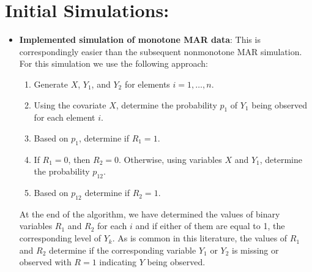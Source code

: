 
\section*{Initial Simulations:}

\begin{itemize}
  \item \textbf{Implemented simulation of monotone MAR data}: 
    This is correspondingly easier than the subsequent nonmonotone MAR
    simulation. For this simulation we use the following approach:
  \begin{enumerate}
      \item Generate $X$, $Y_1$, and $Y_2$ for elements $i = 1, \dots, n$.
      \item Using the covariate $X$, determine the probability $p_1$ of $Y_1$
      being observed for each element $i$.
      \item Based on $p_1$, determine if $R_1 = 1$.
      \item If $R_1 = 0$, then $R_2 = 0$. Otherwise, using variables $X$ and
        $Y_1$, determine the probability $p_{12}$.
      \item Based on $p_{12}$ determine if $R_2 = 1$.
  \end{enumerate}
    At the end of the algorithm, we have determined the values of binary
    variables $R_1$ and $R_2$ for each $i$ and if either of them are equal to 1,
    the corresponding level of $Y_{k}$. As is common in this literature, the
    values of $R_1$ and $R_2$ determine if the corresponding variable $Y_1$ or
    $Y_2$ is missing or observed with $R = 1$ indicating $Y$ being observed.
  

\end{itemize}
